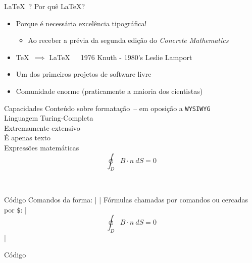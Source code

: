 \documentclass{beamer}
\begin{document}
  \begin{frame}{\LaTeX\ ?}
    Por quê \LaTeX?\\\pause
    \begin{itemize}
      \item{\selectfont Porque é necessária excelência tipográfica!\pause
        \begin{itemize}
          \item Ao receber a prévia da segunda edição do {\em Concrete Mathematics}\pause
        \end{itemize}}
      \item \TeX\ $\implies$ \LaTeX\ \ \ {\scriptsize 1976 Knuth - 1980's Leslie Lamport}\pause
      \item Um dos primeiros projetos de software livre\pause
      \item Comunidade enorme (praticamente a maioria dos cientistas)
    \end{itemize}
  \end{frame}
  \begin{frame}[fragile]{Capacidades}
     Conteúdo sobre formatação\pause\ {\scriptsize-- em oposição a \texttt{WYSIWYG}}\\\pause
     Linguagem Turing-Completa\\\pause
    \onslide<4>{$ \rightarrow $} Extremamente extensivo\\\pause
     É apenas texto\\\pause
     Expressões matemáticas\\\pause
      $$ \oint_{D} B\cdot n\ dS = 0 $$
    \begin{center}
      \pause\href{doc/rogers}{}\\
    \end{center}
\end{frame}
  \begin{frame}[fragile]{Código}
    Comandos da forma: |  |\pause
    Fórmulas chamadas por comandos ou cercadas por {\texttt \$}: |$$ \oint_{D} B\cdot n\ dS = 0 $$|
\end{frame}
  \begin{frame}[fragile]{Código}
    \pause
\end{frame}
\end{document}
